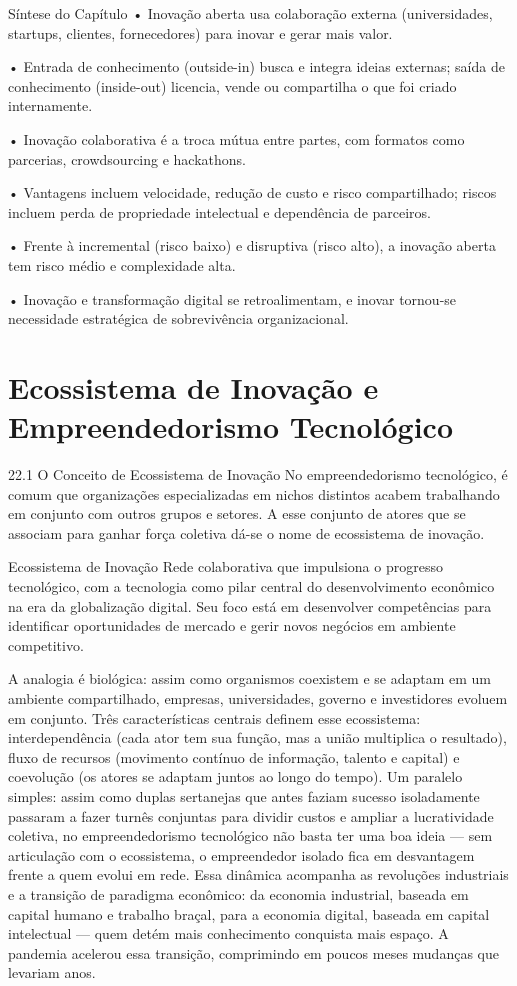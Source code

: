 Síntese do Capítulo • Inovação aberta usa colaboração externa (universidades, startups, clientes, fornecedores) para inovar e gerar mais valor.

• Entrada de conhecimento (outside-in) busca e integra ideias externas; saída de conhecimento (inside-out) licencia, vende ou compartilha o que foi criado internamente.

• Inovação colaborativa é a troca mútua entre partes, com formatos como parcerias, crowdsourcing e hackathons.

• Vantagens incluem velocidade, redução de custo e risco compartilhado; riscos incluem perda de propriedade intelectual e dependência de parceiros.

• Frente à incremental (risco baixo) e disruptiva (risco alto), a inovação aberta tem risco médio e complexidade alta.

• Inovação e transformação digital se retroalimentam, e inovar tornou-se necessidade estratégica de sobrevivência organizacional.

\chapter{Ecossistema de Inovação e Empreendedorismo Tecnológico}

22.1 O Conceito de Ecossistema de Inovação No empreendedorismo tecnológico, é comum que organizações especializadas em nichos distintos acabem trabalhando em conjunto com outros grupos e setores. A esse conjunto de atores que se associam para ganhar força coletiva dá-se o nome de ecossistema de inovação.

Ecossistema de Inovação Rede colaborativa que impulsiona o progresso tecnológico, com a tecnologia como pilar central do desenvolvimento econômico na era da globalização digital. Seu foco está em desenvolver competências para identificar oportunidades de mercado e gerir novos negócios em ambiente competitivo.

A analogia é biológica: assim como organismos coexistem e se adaptam em um ambiente compartilhado, empresas, universidades, governo e investidores evoluem em conjunto. Três características centrais definem esse ecossistema: interdependência (cada ator tem sua função, mas a união multiplica o resultado), fluxo de recursos (movimento contínuo de informação, talento e capital) e coevolução (os atores se adaptam juntos ao longo do tempo). Um paralelo simples: assim como duplas sertanejas que antes faziam sucesso isoladamente passaram a fazer turnês conjuntas para dividir custos e ampliar a lucratividade coletiva, no empreendedorismo tecnológico não basta ter uma boa ideia — sem articulação com o ecossistema, o empreendedor isolado fica em desvantagem frente a quem evolui em rede. Essa dinâmica acompanha as revoluções industriais e a transição de paradigma econômico: da economia industrial, baseada em capital humano e trabalho braçal, para a economia digital, baseada em capital intelectual — quem detém mais conhecimento conquista mais espaço. A pandemia acelerou essa transição, comprimindo em poucos meses mudanças que levariam anos.

